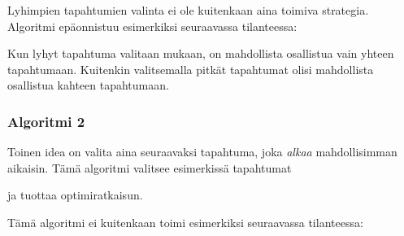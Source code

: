 Lyhimpien tapahtumien valinta ei ole kuitenkaan
aina toimiva strategia.
Algoritmi epäonnistuu esimerkiksi seuraavassa tilanteessa:
\\
\begin{center}
\end{center}

Kun lyhyt tapahtuma valitaan mukaan,
on mahdollista osallistua vain yhteen tapahtumaan.
Kuitenkin valitsemalla pitkät tapahtumat
olisi mahdollista osallistua kahteen tapahtumaan.

\subsubsection*{Algoritmi 2}

Toinen idea on valita aina seuraavaksi tapahtuma,
joka \emph{alkaa} mahdollisimman aikaisin.
Tämä algoritmi valitsee esimerkissä tapahtumat
\\
\begin{center}
\end{center}
ja tuottaa optimiratkaisun.

Tämä algoritmi ei kuitenkaan toimi
esimerkiksi seuraavassa tilanteessa:
\\
\begin{center}
\end{center}

